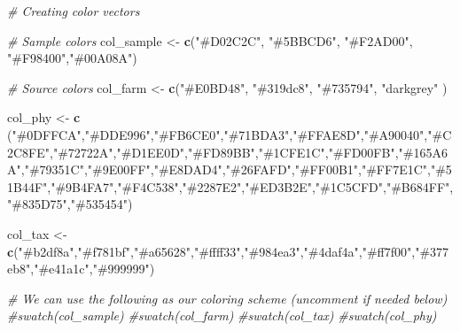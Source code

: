 \documentclass[
]{article}
\newenvironment{Shaded}{\begin{snugshade}}{\end{snugshade}}
\newcommand{\CommentTok}[1]{\textcolor[rgb]{0.56,0.35,0.01}{\textit{#1}}}
\newcommand{\FunctionTok}[1]{\textcolor[rgb]{0.13,0.29,0.53}{\textbf{#1}}}
\newcommand{\NormalTok}[1]{#1}
\newcommand{\OtherTok}[1]{\textcolor[rgb]{0.56,0.35,0.01}{#1}}
\newcommand{\StringTok}[1]{\textcolor[rgb]{0.31,0.60,0.02}{#1}}
\begin{document}
\begin{Shaded}
\begin{Highlighting}[]
\CommentTok{\# Creating color vectors}

\CommentTok{\# Sample colors}
\NormalTok{col\_sample }\OtherTok{\textless{}{-}} \FunctionTok{c}\NormalTok{(}\StringTok{"\#D02C2C"}\NormalTok{, }\StringTok{"\#5BBCD6"}\NormalTok{, }\StringTok{"\#F2AD00"}\NormalTok{, }\StringTok{"\#F98400"}\NormalTok{,}\StringTok{"\#00A08A"}\NormalTok{)}

\CommentTok{\# Source colors}
\NormalTok{col\_farm }\OtherTok{\textless{}{-}} \FunctionTok{c}\NormalTok{(}\StringTok{"\#E0BD48"}\NormalTok{, }\StringTok{"\#319dc8"}\NormalTok{, }\StringTok{"\#735794"}\NormalTok{, }\StringTok{"darkgrey"}\NormalTok{ )}

\NormalTok{col\_phy }\OtherTok{\textless{}{-}} \FunctionTok{c}\NormalTok{ (}\StringTok{"\#0DFFCA"}\NormalTok{,}\StringTok{"\#DDE996"}\NormalTok{,}\StringTok{"\#FB6CE0"}\NormalTok{,}\StringTok{"\#71BDA3"}\NormalTok{,}\StringTok{"\#FFAE8D"}\NormalTok{,}\StringTok{"\#A90040"}\NormalTok{,}\StringTok{"\#C2C8FE"}\NormalTok{,}\StringTok{"\#72722A"}\NormalTok{,}\StringTok{"\#D1EE0D"}\NormalTok{,}\StringTok{"\#FD89BB"}\NormalTok{,}\StringTok{"\#1CFE1C"}\NormalTok{,}\StringTok{"\#FD00FB"}\NormalTok{,}\StringTok{"\#165A6A"}\NormalTok{,}\StringTok{"\#79351C"}\NormalTok{,}\StringTok{"\#9E00FF"}\NormalTok{,}\StringTok{"\#E8DAD4"}\NormalTok{,}\StringTok{"\#26FAFD"}\NormalTok{,}\StringTok{"\#FF00B1"}\NormalTok{,}\StringTok{"\#FF7E1C"}\NormalTok{,}\StringTok{"\#51B44F"}\NormalTok{,}\StringTok{"\#9B4FA7"}\NormalTok{,}\StringTok{"\#F4C538"}\NormalTok{,}\StringTok{"\#2287E2"}\NormalTok{,}\StringTok{"\#ED3B2E"}\NormalTok{,}\StringTok{"\#1C5CFD"}\NormalTok{,}\StringTok{"\#B684FF"}\NormalTok{,}\StringTok{"\#835D75"}\NormalTok{,}\StringTok{"\#535454"}\NormalTok{)}

\NormalTok{col\_tax }\OtherTok{\textless{}{-}} \FunctionTok{c}\NormalTok{(}\StringTok{"\#b2df8a"}\NormalTok{,}\StringTok{"\#f781bf"}\NormalTok{,}\StringTok{"\#a65628"}\NormalTok{,}\StringTok{"\#ffff33"}\NormalTok{,}\StringTok{"\#984ea3"}\NormalTok{,}\StringTok{"\#4daf4a"}\NormalTok{,}\StringTok{"\#ff7f00"}\NormalTok{,}\StringTok{"\#377eb8"}\NormalTok{,}\StringTok{"\#e41a1c"}\NormalTok{,}\StringTok{"\#999999"}\NormalTok{)}

\CommentTok{\# We can use the following as our coloring scheme (uncomment if needed below)}
\CommentTok{\#swatch(col\_sample)}
\CommentTok{\#swatch(col\_farm)}
\CommentTok{\#swatch(col\_tax)}
\CommentTok{\#swatch(col\_phy)}
\end{Highlighting}
\end{Shaded}
\end{document}
